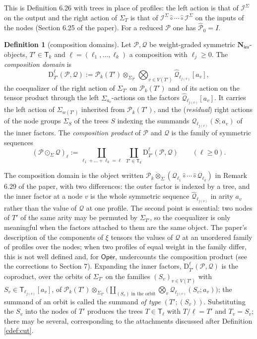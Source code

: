 \documentclass[12pt]{article}
\theoremstyle{plain}
\theoremstyle{definition}
\newtheorem{cdefinition}[ctheorem]{Definition}
\theoremstyle{remark}
\newcommand{\Cal}[1]{\mathcal{#1}}
\newcommand{\Nl}{\mathbf{N}_{\mathsf{lev}}}
\newcommand{\Oper}{\mathsf{Oper}}
\newcommand{\circhat}{\hat{\circ}}
\newcommand{\circdot}{\odot}
\newcommand{\tensordot}{\dot{\otimes}}
\newcommand{\Isym}{\Cal{I}^{\Sigma}}
\newcommand{\Tr}{\mathsf{T}}
\newcommand{\wt}{w}
\newcommand{\Dm}{\mathrm{D}}
\begin{document}
This is Definition 6.26 with trees in place of profiles: the left action is that of $\Isym$ on the output and the right action of $\Sigma_T$ is that of $\Isym\circhat\cdots\circhat\Isym$ on the inputs of the nodes (Section 6.25 of the paper). For a reduced $\Cal P$ one has $\widehat{\Cal P}_0=I$.

\begin{cdefinition}[composition domains]\label{cdef:domain}
Let $\Cal P,\Cal Q$ be weight-graded symmetric $\Nl$-objects, $T'\in\Tr_k$ and $\underline\ell=(\ell_1,\dots,\ell_k)$ a composition with $\ell_j\geq0$. The \emph{composition domain} is
\[\Dm^{\underline\ell}_{T'}(\Cal P,\Cal Q):=\Cal P_k(T')\otimes_{\Sigma_{T'}}\bigotimes_{v\in V(T')}\widehat{\Cal Q}_{\ell_{j(v)}}[a_v],\]
the coequalizer of the right action of $\Sigma_{T'}$ on $\Cal P_k(T')$ and of its action on the tensor product through the left $\Sigma_{a_v}$-actions on the factors $\widehat{\Cal Q}_{\ell_{j(v)}}[a_v]$. It carries the left action of $\Sigma_{\wt(T')}$ inherited from $\Cal P_k(T')$, and the (\emph{residual}) right actions of the node groups $\Sigma_S$ of the trees $S$ indexing the summands $\Cal Q_{\ell_{j(v)}}(S;a_v)$ of the inner factors. The \emph{composition product} of $\Cal P$ and $\Cal Q$ is the family of symmetric sequences
\[(\Cal P\circdot_\Sigma\Cal Q)_\ell:=\coprod_{\ell_1+\dots+\ell_k=\ell}\ \coprod_{T'\in\Tr_k}\Dm^{\underline\ell}_{T'}(\Cal P,\Cal Q)\qquad(\ell\geq0).\]
\end{cdefinition}

The composition domain is the object written $\Cal P_k\tensordot_\Sigma(\Cal Q_{\ell_1}\circhat\cdots\circhat\Cal Q_{\ell_k})$ in Remark 6.29 of the paper, with two differences: the outer factor is indexed by a tree, and the inner factor at a node $v$ is the whole symmetric sequence $\widehat{\Cal Q}_{\ell_{j(v)}}$ in arity $a_v$ rather than the value of $\Cal Q$ at one profile. The second point is essential: two nodes of $T'$ of the same arity may be permuted by $\Sigma_{T'}$, so the coequalizer is only meaningful when the factors attached to them are the same object. The paper's description of the components of $\xi$ tensors the values of $\Cal Q$ at an unordered family of profiles over the nodes; when two profiles of equal weight in the family differ, this is not well defined and, for $\Oper$, undercounts the composition product (see the corrections to Section 7). Expanding the inner factors, $\Dm^{\underline\ell}_{T'}(\Cal P,\Cal Q)$ is the coproduct, over the orbits of $\Sigma_{T'}$ on the families $(S_v)_{v\in V(T')}$ with $S_v\in\Tr_{\ell_{j(v)}}[a_v]$, of $\Cal P_k(T')\otimes_{\Sigma_{T'}}\big(\coprod_{(S_v)\text{ in the orbit}}\bigotimes_v\Cal Q_{\ell_{j(v)}}(S_v;a_v)\big)$; the summand of an orbit is called the summand \emph{of type} $(T';(S_v))$. Substituting the $S_v$ into the nodes of $T'$ produces the trees $T\in\Tr_\ell$ with $T/\underline\ell=T'$ and $T_v=S_v$; there may be several, corresponding to the attachments discussed after Definition \ref{cdef:cut}.
\end{document}
